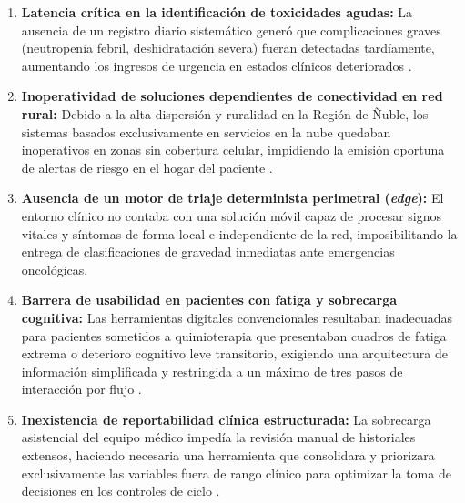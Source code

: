 \begin{enumerate}
    \item \textbf{Latencia crítica en la identificación de toxicidades agudas:} La ausencia de un registro diario sistemático generó que complicaciones graves (neutropenia febril, deshidratación severa) fueran detectadas tardíamente, aumentando los ingresos de urgencia en estados clínicos deteriorados \parencite{minsal2022plancancer, entrevistaHCHM2026}.
    \item \textbf{Inoperatividad de soluciones dependientes de conectividad en red rural:} Debido a la alta dispersión y ruralidad en la Región de Ñuble, los sistemas basados exclusivamente en servicios en la nube quedaban inoperativos en zonas sin cobertura celular, impidiendo la emisión oportuna de alertas de riesgo en el hogar del paciente \parencite{ine2024censo, minsal2022plancancer}.
    \item \textbf{Ausencia de un motor de triaje determinista perimetral (\textit{edge}):} El entorno clínico no contaba con una solución móvil capaz de procesar signos vitales y síntomas de forma local e independiente de la red, imposibilitando la entrega de clasificaciones de gravedad inmediatas ante emergencias oncológicas.
    \item \textbf{Barrera de usabilidad en pacientes con fatiga y sobrecarga cognitiva:} Las herramientas digitales convencionales resultaban inadecuadas para pacientes sometidos a quimioterapia que presentaban cuadros de fatiga extrema o deterioro cognitivo leve transitorio, exigiendo una arquitectura de información simplificada y restringida a un máximo de tres pasos de interacción por flujo \parencite{entrevistaHCHM2026}.
    \item \textbf{Inexistencia de reportabilidad clínica estructurada:} La sobrecarga asistencial del equipo médico impedía la revisión manual de historiales extensos, haciendo necesaria una herramienta que consolidara y priorizara exclusivamente las variables fuera de rango clínico para optimizar la toma de decisiones en los controles de ciclo \parencite{entrevistaHCHM2026}.
\end{enumerate}